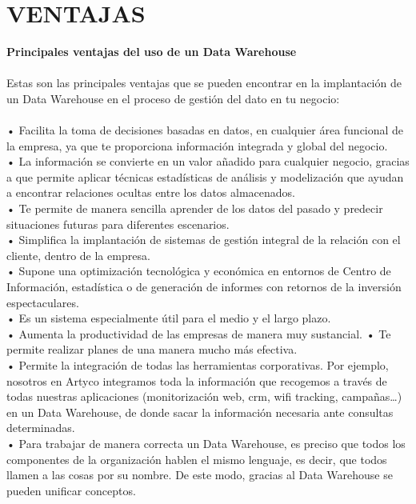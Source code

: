 \section{VENTAJAS}
\item{\textbf{Principales ventajas del uso de un Data Warehouse}\\\\
Estas son las principales ventajas que se pueden encontrar en la implantación de un Data Warehouse en el proceso de gestión del dato en tu negocio:\\\\
•	Facilita la toma de decisiones basadas en datos, en cualquier área funcional de la empresa, ya que te proporciona información integrada y global del negocio.\\
•	La información se convierte en un valor añadido para cualquier negocio, gracias a que permite aplicar técnicas estadísticas de análisis y modelización que ayudan a encontrar relaciones ocultas entre los datos almacenados.\\
•	Te permite de manera sencilla aprender de los datos del pasado y predecir situaciones futuras para diferentes escenarios.\\
•	Simplifica la implantación de sistemas de gestión integral de la relación con el cliente, dentro de la empresa.\\
•	Supone una optimización tecnológica y económica en entornos de Centro de Información, estadística o de generación de informes con retornos de la inversión espectaculares.\\
•	Es un sistema especialmente útil para el medio y el largo plazo.\\
•	Aumenta la productividad de las empresas de manera muy sustancial.
•	Te permite realizar planes de una manera mucho más efectiva.\\
•	Permite la integración de todas las herramientas corporativas. Por ejemplo, nosotros en Artyco integramos toda la información que recogemos a través de todas nuestras aplicaciones (monitorización web, crm, wifi tracking, campañas…) en un Data Warehouse, de donde sacar la información necesaria ante consultas determinadas.\\
•	Para trabajar de manera correcta un Data Warehouse, es preciso que todos los componentes de la organización hablen el mismo lenguaje, es decir, que todos llamen a las cosas por su nombre. De este modo, gracias al Data Warehouse se pueden unificar conceptos.

}

